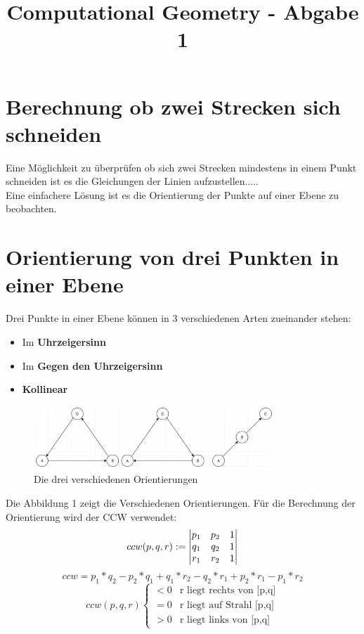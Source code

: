 \documentclass[conference]{IEEEtran}
\begin{document}
\title{Computational Geometry - Abgabe 1}

\author{
}

\maketitle


\section{Berechnung ob zwei Strecken sich schneiden}
Eine Möglichkeit zu überprüfen ob sich zwei Strecken mindestens in einem Punkt schneiden ist es die Gleichungen der Linien aufzustellen.....\\
Eine einfachere Lösung ist es die Orientierung der Punkte auf einer Ebene zu beobachten.

\section{Orientierung von drei Punkten in einer Ebene}
Drei Punkte in einer Ebene können in 3 verschiedenen Arten zueinander stehen:
\begin{itemize}
	\item Im \textbf{Uhrzeigersinn}
	\item Im \textbf{Gegen den Uhrzeigersinn}
	\item \textbf{Kollinear}
\end{itemize}
\begin{figure}[h]
	\begin{center}
		\includegraphics[width=9cm]{Orientation.png}
		\caption{Die drei verschiedenen Orientierungen}
		\label{figure_3}
	\end{center}
\end{figure}
Die Abbildung 1 zeigt die Verschiedenen Orientierungen. Für die Berechnung der Orientierung wird der CCW verwendet:
\[ 
ccw(p,q,r) := 
\begin{vmatrix}
	p_1 & p_2 & 1 \\ 
	q_1 & q_2 & 1 \\ 
	r_1 & r_2 & 1 \notag
\end{vmatrix} \]
\[ ccw = p_1*q_2 - p_2*q_1 + q_1*r_2 - q_2*r_1 + p_2*r_1 - p_1*r_2\]
\[ ccw(p,q,r) \begin{cases} < 0 &\text{r liegt rechts von [p,q]}\\ = 0 &\text{r liegt auf Strahl [p,q]}\\ > 0 &\text{r liegt links von [p,q]}\end{cases} \]
\end{document}
